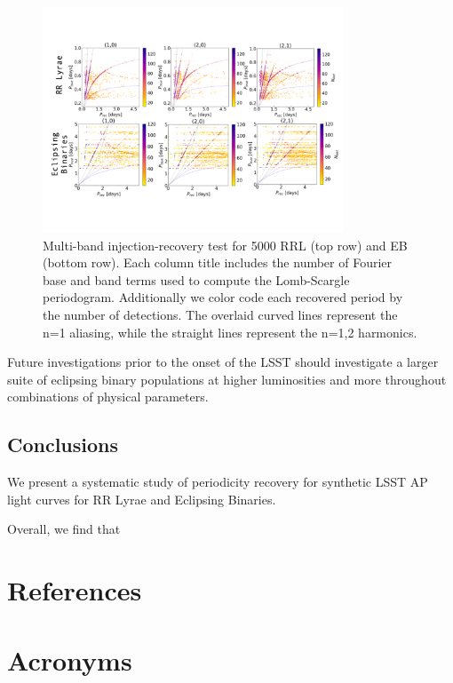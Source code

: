 \documentclass[DM,authoryear,toc]{lsstdoc}
\begin{document}
\begin{figure}
  \includegraphics[width=0.8\textwidth]{figures/multi_lsp_rectest.pdf}
  \centering 
  \caption{Multi-band injection-recovery test for 5000 RRL (top row) and EB (bottom row). Each column title includes the number of Fourier base and band terms used to compute the Lomb-Scargle periodogram. Additionally we color code each recovered period by the number of detections. The overlaid curved lines represent the n=1 aliasing, while the straight lines represent the n=1,2 harmonics.}
  \label{fig:multi_lsp_custom}
\end{figure}



Future investigations prior to the onset of the LSST should investigate a larger suite of eclipsing binary populations at higher luminosities and more throughout  combinations of physical parameters. 

\subsection{Conclusions}

We present a systematic study of periodicity recovery for synthetic LSST AP light curves for RR Lyrae and Eclipsing Binaries.

Overall, we find that 


\appendix
\section{References} \label{sec:bib}


\section{Acronyms} \label{sec:acronyms}

\end{document}
